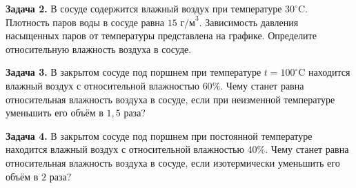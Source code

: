 \begin{taskbasic}[code={\label{task:mkt_hum_v8_n22}}]
\textbf{Задача 2.} В сосуде содержится влажный воздух при температуре $30^{\circ}\text{C}$. Плотность паров воды в сосуде равна $15\text{ г/м}^3$. Зависимость давления насыщенных паров от температуры представлена на графике. Определите относительную влажность воздуха в сосуде.

\nopagebreak\smallskip
\begin{center}
\end{center}

\end{taskbasic}

\begin{taskbasic}[code={\label{task:mkt_hum_v11_n7}}]
\textbf{Задача 3.} В закрытом сосуде под поршнем при температуре $t = 100^{\circ}\text{C}$ находится влажный воздух с относительной влажностью $60\%$. Чему станет равна относительная влажность воздуха в сосуде, если при неизменной температуре уменьшить его объём в $1{,}5$ раза?

\end{taskbasic}

\begin{taskbasic}[code={\label{task:mkt_hum_v12_n7}}]
\textbf{Задача 4.} В закрытом сосуде под поршнем при постоянной температуре находится влажный воздух с относительной влажностью $40\%$. Чему станет равна относительная влажность воздуха в сосуде, если изотермически уменьшить его объём в $2$ раза?

\end{taskbasic}

